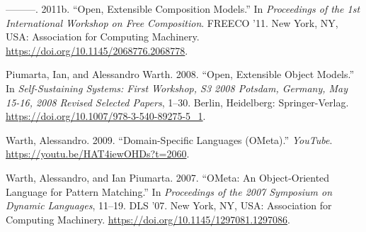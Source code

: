\begin{CSLReferences}{1}{0}
\leavevmode{}%
---------. 2011b. {``Open, Extensible Composition Models.''} In
\emph{Proceedings of the 1st International Workshop on Free
Composition}. FREECO '11. New York, NY, USA: Association for Computing
Machinery. \url{https://doi.org/10.1145/2068776.2068778}.

\leavevmode{}%
Piumarta, Ian, and Alessandro Warth. 2008. {``Open, Extensible Object
Models.''} In \emph{Self-Sustaining Systems: First Workshop, S3 2008
Potsdam, Germany, May 15-16, 2008 Revised Selected Papers}, 1--30.
Berlin, Heidelberg: Springer-Verlag.
\url{https://doi.org/10.1007/978-3-540-89275-5_1}.

\leavevmode{}%
Warth, Alessandro. 2009. {``Domain-Specific Languages (OMeta).''}
\emph{YouTube}. \url{https://youtu.be/HAT4iewOHDs?t=2060}.

\leavevmode{}%
Warth, Alessandro, and Ian Piumarta. 2007. {``OMeta: An Object-Oriented
Language for Pattern Matching.''} In \emph{Proceedings of the 2007
Symposium on Dynamic Languages}, 11--19. DLS '07. New York, NY, USA:
Association for Computing Machinery.
\url{https://doi.org/10.1145/1297081.1297086}.

\end{CSLReferences}
